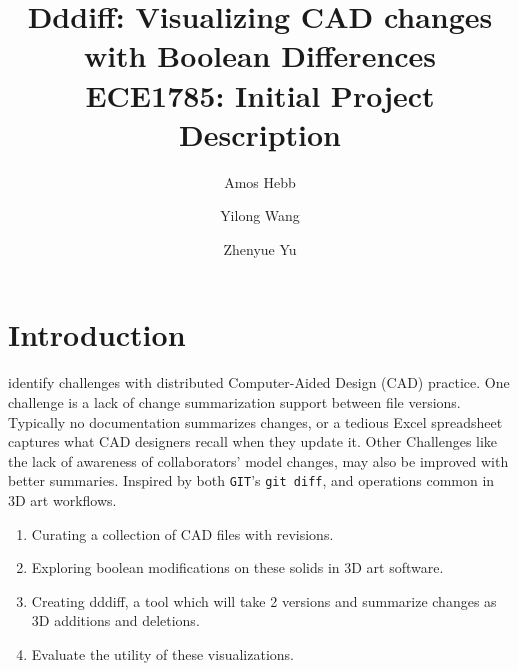\documentclass[sigconf]{acmart}
\begin{document}
\title{Dddiff: Visualizing CAD changes with Boolean Differences\\
{\normalsize ECE1785: Initial Project Description}}

\author{Amos Hebb}
\author{Yilong Wang}
\author{Zhenyue Yu}

\maketitle






\section{Introduction}

\citet{cheng2023age} identify challenges with distributed Computer-Aided Design (CAD) practice.
One challenge is a lack of change summarization support between file versions.
Typically no documentation summarizes changes, or a tedious Excel spreadsheet captures what CAD designers recall when they update it.
Other Challenges like the lack of awareness of collaborators' model changes, may also be improved with better summaries.
Inspired by both \texttt{GIT}'s \texttt{git diff}, and operations common in 3D art workflows.

\begin{enumerate}
	\item Curating a collection of CAD files with revisions.
	\item Exploring boolean modifications on these solids in 3D art software.
	\item Creating dddiff, a tool which will take 2 versions and summarize changes as 3D additions and deletions.
	\item Evaluate the utility of these visualizations.
\end{enumerate}
\end{document}
